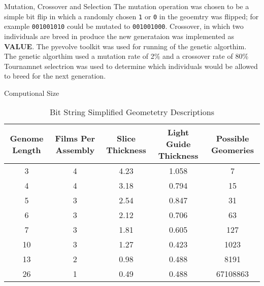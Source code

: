 \begin{frame}[fragile]{Mutation, Crossover and Selection}
The mutation operation was chosen to be a simple bit flip in which a randomly chosen \verb+1+ or \verb+0+ in the geoemtry was flipped; for example \verb+001001010+ could be mutated to \verb+001001000+.
Crossover, in which two individuals are breed in produce the new generataion was implemented as \textbf{VALUE}.
The pyevolve toolkit was used for running of the genetic algorthim.
The genetic algorthim used a mutation rate of 2\% and a crossover rate of 80\%
Tournamnet selectrion was used to determine which individuals would be allowed to breed for the next generation.
\end{frame}
\begin{frame}{Computional Size}
\begin{table}
    \caption[Genome Bit String Geometries]{Bit String Simplified Geometetry Descriptions}
    \label{tab:BitStringGeo}
    \centering
    \begin{tabular}{ c | c c c c}
        Genome Length&Films Per Assembly&Slice Thickness&Light Guide Thickness&Possible Geomeries \\
        \hline
        \hline
        3&4&4.23&1.058&7 \\
        4&4&3.18&0.794&15 \\
        5&3&2.54&0.847&31 \\
        6&3&2.12&0.706&63 \\
        7&3&1.81&0.605&127 \\ 
        \hline
        10&3&1.27&0.423&1023 \\
        \hline
        13&2&0.98&0.488&8191 \\
        26&1&0.49&0.488&67108863 \\
    \end{tabular}
\end{table}
\end{frame}


